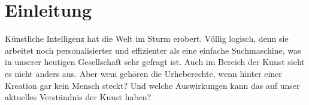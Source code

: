 \section{Einleitung}
\label{sec:introduction}

Künstliche Intelligenz hat die Welt im Sturm erobert. Völlig logisch, denn sie arbeitet noch personalisierter und effizienter als eine einfache Suchmaschine, was in unserer heutigen Gesellschaft sehr gefragt ist. Auch im Bereich der Kunst sieht es nicht anders aus. Aber wem gehören die Urheberechte, wenn hinter einer Kreation gar kein Mensch steckt? Und welche Auswirkungen kann das auf unser aktuelles Verständnis der Kunst haben?